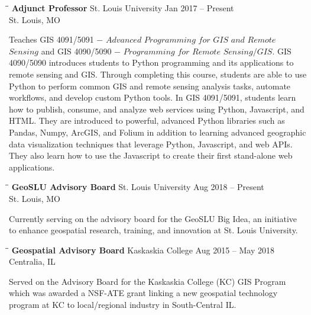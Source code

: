 \documentclass{res}
\begin{document}
\begin{resume}
   \begin{tabbing}
	\hspace{2.3in}\= \hspace{2.6in}\= \kill %
	{\bf Adjunct Professor} \>St. Louis University     \>Jan 2017 -- Present\\
	\>St. Louis, MO
\end{tabbing}\vspace{-20pt}      %
Teaches GIS 4091/5091 $-$ $Advanced$ $Programming$ $for$ $GIS$ $and$ $Remote$ $Sensing$ and GIS 4090/5090 $-$ $Programming$ $for$ $Remote$ $Sensing/GIS$. GIS 4090/5090 introduces students to Python programming and its applications to remote sensing and GIS. Through completing this course, students are able to use Python to perform common GIS and remote sensing analysis tasks, automate workflows, and develop custom Python tools. In GIS 4091/5091, students learn how to publish, consume, and analyze web services using Python, Javascript, and HTML. They are introduced to powerful, advanced Python libraries such as Pandas, Numpy, ArcGIS, and Folium in addition to learning advanced geographic data visualization techniques that leverage Python, Javascript, and web APIs. They also learn how to use the Javascript to create their first stand-alone web applications. 



   \begin{tabbing}
	\hspace{2.3in}\= \hspace{2.6in}\= \kill %
	{\bf GeoSLU Advisory Board} \>St. Louis University     \>Aug 2018 -- Present\\
	\>St. Louis, MO
\end{tabbing}\vspace{-20pt}      %
Currently serving on the advisory board for the GeoSLU Big Idea, an initiative to enhance geospatial research, training, and innovation at St. Louis University.

\begin{tabbing}
	\hspace{2.3in}\= \hspace{2.6in}\= \kill %
	{\bf Geospatial Advisory Board} \>Kaskaskia College     \>Aug 2015 -- May 2018\\
	\>Centralia, IL
\end{tabbing}\vspace{-20pt}      %
Served on the Advisory Board for the Kaskaskia College (KC) GIS Program which was awarded a NSF-ATE grant linking a new geospatial technology program at KC to local/regional industry in South-Central IL.
   

\end{resume}
\end{document}
